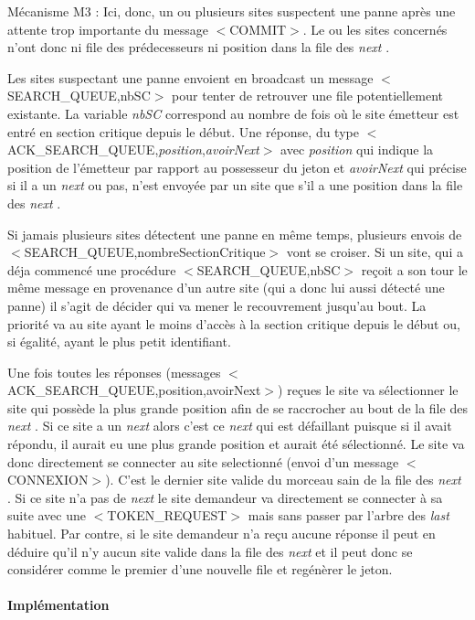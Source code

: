 \documentclass[a4paper,12pt]{article}
\newcommand{\last}{\textit{last} }
\newcommand{\next}{\textit{next} }
\begin{document}
Mécanisme M3 : Ici, donc, un ou plusieurs sites suspectent une panne après une attente trop importante du message $<$COMMIT$>$. Le ou les sites concernés n'ont donc ni file des prédecesseurs ni position dans la file des \next. 

Les sites suspectant une panne envoient en broadcast un message $<$SEARCH\_QUEUE,nbSC$>$ pour tenter de retrouver une file potentiellement existante. La variable \textit{nbSC} correspond au nombre de fois où le site émetteur est entré en section critique depuis le début. Une réponse, du type $<$ACK\_SEARCH\_QUEUE,\textit{position},\textit{avoirNext}$>$ avec \textit{position} qui indique la position de l'émetteur par rapport au possesseur du jeton et \textit{avoirNext} qui précise si il a un \next ou pas, n'est envoyée par un site que s'il a une position dans la file des \next. 

Si jamais plusieurs sites détectent une panne en même temps, plusieurs envois de $<$SEARCH\_QUEUE,nombreSectionCritique$>$ vont se croiser. Si un site, qui a déja commencé une procédure $<$SEARCH\_QUEUE,nbSC$>$ reçoit a son tour le même message en provenance d'un autre site (qui a donc lui aussi détecté une panne) il s'agit de décider qui va mener le recouvrement jusqu'au bout. La priorité va au site ayant le moins d'accès à la section critique depuis le début ou, si égalité, ayant le plus petit identifiant.

Une fois toutes les réponses (messages $<$ACK\_SEARCH\_QUEUE,position,avoirNext$>$) reçues le site va sélectionner le site qui possède la plus grande position afin de se raccrocher au bout de la file des \next.
Si ce site a un \next alors c'est ce \next qui est défaillant puisque si il avait répondu, il aurait eu une plus grande position et aurait été sélectionné. Le site va donc directement se connecter au site selectionné (envoi d'un message $<$CONNEXION$>$). C'est le dernier site valide du morceau sain de la file des \next.
Si ce site n'a pas de \next le site demandeur va directement se connecter à sa suite avec une $<$TOKEN\_REQUEST$>$ mais sans passer par l'arbre des \last habituel.
Par contre, si le site demandeur n'a reçu aucune réponse il peut en déduire qu'il n'y aucun site valide dans la file des \next et il peut donc se considérer comme le premier d'une nouvelle file et regénèrer le jeton.



\paragraph{Implémentation}
\end{document}

